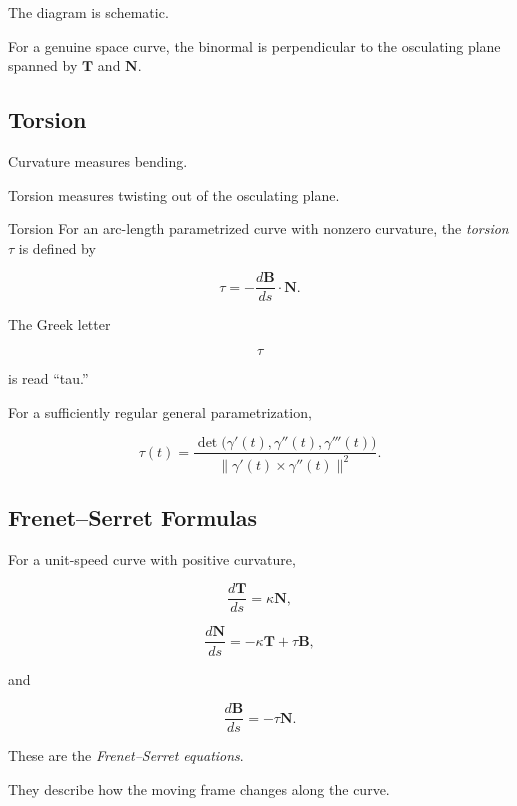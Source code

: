 The diagram is schematic.

For a genuine space curve, the binormal is perpendicular to the osculating
plane spanned by \(\mathbf{T}\) and \(\mathbf{N}\).

\subsection{Torsion}
\label{subsec:curve-torsion}

Curvature measures bending.

Torsion measures twisting out of the osculating plane.

\begin{definitionbox}{Torsion}
For an arc-length parametrized curve with nonzero curvature, the
\emph{torsion} \(\tau\) is defined by

\[
\boxed{
\tau
=
-
\frac{d\mathbf{B}}{ds}\cdot\mathbf{N}.
}
\]
\end{definitionbox}

The Greek letter

\[
\tau
\]

is read ``tau.''

For a sufficiently regular general parametrization,

\[
\boxed{
\tau(t)
=
\frac{
\det\bigl(\gamma'(t),\gamma''(t),\gamma'''(t)\bigr)
}{
\|\gamma'(t)\times\gamma''(t)\|^2
}.
}
\]

\subsection{Frenet--Serret Formulas}
\label{subsec:frenet-serret}

For a unit-speed curve with positive curvature,

\[
\boxed{
\frac{d\mathbf{T}}{ds}
=
\kappa\mathbf{N},
}
\]

\[
\boxed{
\frac{d\mathbf{N}}{ds}
=
-\kappa\mathbf{T}
+
\tau\mathbf{B},
}
\]

and

\[
\boxed{
\frac{d\mathbf{B}}{ds}
=
-\tau\mathbf{N}.
}
\]

These are the \emph{Frenet--Serret equations}.

They describe how the moving frame changes along the curve.


